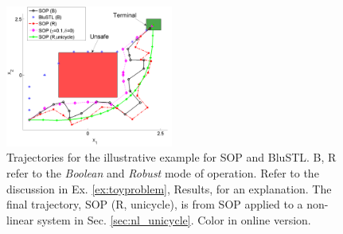 \begin{exmp}
\begin{figure}[t]
\centering
\includegraphics[width=0.49\textwidth]{figures/ToyExUni_scissored.pdf}
\vspace{-20pt}
\caption{{\small Trajectories for the illustrative example for SOP and BluSTL. B, R refer to the \textit{Boolean} and \textit{Robust} mode of operation. Refer to the discussion in Ex. \ref{ex:toyproblem}, Results, for an explanation. The final trajectory, SOP (R, unicycle), is from SOP applied to a non-linear system in Sec. \ref{sec:nl_unicycle}. Color in online version.}}
\label{fig:toy control}
\vspace{-10pt}
\end{figure}

\end{exmp}
